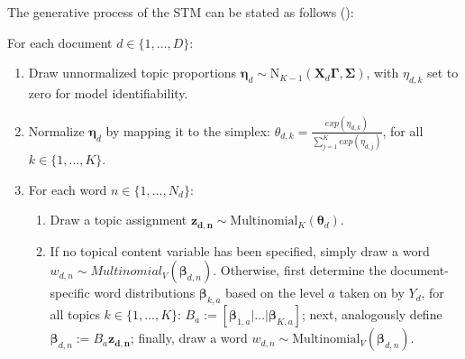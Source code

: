 \documentclass[12pt]{article}
\begin{document}
\noindent
The generative process of the STM can be stated as follows (\citealp{roberts2016model}):

\vspace{0.25cm}
\noindent
For each document $d \in \{1,\dots,D\}$:

\begin{enumerate}[{1)}]
\vspace{-0.25cm}
\item Draw unnormalized topic proportions $\boldsymbol{\eta}_d \sim \text{N}_{K-1}(\boldsymbol{X}_d\boldsymbol{\Gamma}, \boldsymbol{\Sigma})$, with $\eta_{d,k}$ set to zero for model identifiability.
\vspace{-0.25cm}
\item Normalize $\boldsymbol{\eta}_d$ by mapping it to the simplex: $\theta_{d,k} = \frac{exp(\eta_{d,k})}{\sum_{j=1}^{K}exp(\eta_{d,j})}$, for all $k \in \{1,\dots,K\}$.
\vspace{-0.25cm}
\item For each word $n \in \{1,\dots,N_d\}$:
	\begin{enumerate}[{a)}]
	\vspace{-0.25cm}    
    \item Draw a topic assignment $\boldsymbol{z_{d,n}} \sim \text{Multinomial}_K(\boldsymbol{\theta}_d)$.
	\vspace{-0.25cm}    
    \item If no topical content variable has been specified, simply draw a word $w_{d,n} \sim Multinomial_V(\boldsymbol{\beta}_{d,n})$. Otherwise, first determine the document-specific word distributions $\boldsymbol{\beta}_{k,a}$ based on the level $a$ taken on by $Y_d$, for all topics $k \in \{1,\dots,K\}$: $B_a := [\boldsymbol{\beta}_{1,a}|\dots|\boldsymbol{\beta}_{K,a}]$; next, analogously define $\boldsymbol{\beta}_{d,n}:=B_a\boldsymbol{z_{d,n}}$; finally, draw a word $w_{d,n} \sim \text{Multinomial}_V(\boldsymbol{\beta}_{d,n})$.
	\end{enumerate}
\end{enumerate}
\end{document}
